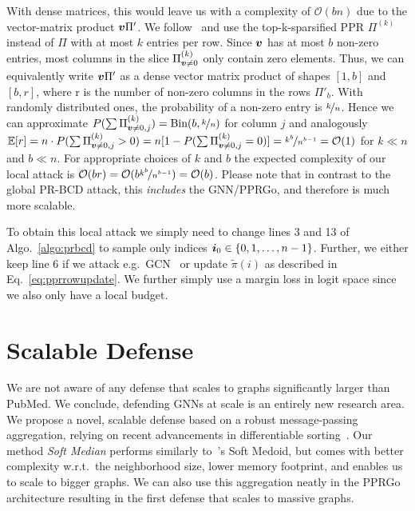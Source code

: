 \documentclass[sigconf, review]{acmart}
\begin{document}
With dense matrices, this would leave us with a complexity of \(\mathcal{O}(b n)\) due to the vector-matrix product \({\bm{v}} \Pi'\). We follow~\citet{Bojchevski2020a} and use the top-k-sparsified PPR \(\Pi^{(k)}\) instead of \(\Pi\) with at most \(k\) entries per row. Since \({\bm{v}}\) has at most \(b\) non-zero entries, most columns in the slice \(\Pi^{(k)}_{{\bm{v}}\ne0}\) only contain zero elements. Thus, we can equivalently write \({\bm{v}} \Pi'\) as a dense vector matrix product of shapes \([1, b]\) and \([b, r]\), where r is the number of non-zero columns in the rows \(\Pi'_b\). With randomly distributed ones, the probability of a non-zero entry is \(\nicefrac{k}{n}\). Hence we can approximate \(P(\sum \Pi^{(k)}_{{\bm{v}}\ne0, j}) = \text{Bin}(b, \nicefrac{k}{n})\) for column \(j\) and analogously \(\mathbb{E}[r]  = n \cdot P(\sum \Pi^{(k)}_{{\bm{v}}\ne0, j} > 0) = n [ 1 - P(\sum \Pi^{(k)}_{{\bm{v}}\ne0, j} = 0) ] = \nicefrac{k^b}{n^{b-1}} = \mathcal{O}(1) \) for \(k \ll n\) and \(b \ll n\). For appropriate choices of \(k\) and \(b\) the expected complexity of our local attack is \(\mathcal{O}(b r) = \mathcal{O}(b \nicefrac{k^b}{n^{b-1}}) = \mathcal{O}(b)\). Please note that in contrast to the global PR-BCD attack, this \emph{includes} the GNN/PPRGo, and therefore is much more scalable. 

To obtain this local attack we simply need to change lines 3 and 13 of Algo.~\ref{algo:prbcd} to sample only indices \({\bm{i}}_0 \in \{0, 1, \dots, n-1\}\). Further, we either keep line 6 if we attack e.g.\ GCN~\cite{Kipf2017} or update \(\tilde{\pi}(i)\) as described in Eq.~\ref{eq:pprrowupdate}. We further simply use a margin loss in logit space since we also only have a local budget.

\section{Scalable Defense}\label{sec:defense}
We are not aware of any defense that scales to graphs significantly larger than PubMed. We conclude, defending GNNs at scale is an entirely new research area. We propose a novel, scalable defense based on a robust message-passing aggregation, relying on recent advancements in differentiable sorting~\cite{Prillo2020}. Our method \emph{Soft Median} performs similarly to~\citet{Geisler2020}'s Soft Medoid, but comes with better complexity w.r.t.\ the neighborhood size, lower memory footprint, and enables us to scale to bigger graphs. We can also use this aggregation neatly in the PPRGo architecture resulting in the first defense that scales to massive graphs.
\end{document}
